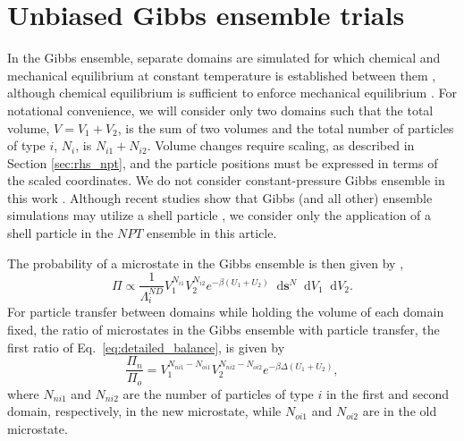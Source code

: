 \documentclass[
  9pt,
  bestpractices,
  pubversion,
]{livecoms}
\newcommand*\diff{\mathop{}\!\mathrm{d}}
\begin{document}
\begin{figure}

\end{figure}

\section{\label{sec:rhs_gibbs}Unbiased Gibbs ensemble trials}

In the Gibbs ensemble, separate domains are simulated for which chemical and mechanical equilibrium at constant temperature is established between them \cite{panagiotopoulos_direct_1987}, although chemical equilibrium is sufficient to enforce mechanical equilibrium \cite{panagiotopoulos_adsorption_1987}.
For notational convenience, we will consider only two domains such that the total volume, $V=V_1+V_2$, is the sum of two volumes and the total number of particles of type $i$, $N_i$, is $N_{i1} + N_{i2}$.
Volume changes require scaling, as described in Section \ref{sec:rhs_npt}, and the particle positions must be expressed in terms of the scaled coordinates.
We do not consider constant-pressure Gibbs ensemble in this work \cite{panagiotopoulos_phase_1988}.
Although recent studies show that Gibbs (and all other) ensemble simulations may utilize a shell particle \cite{hatch_theory_2024}, we consider only the application of a shell particle in the $NPT$ ensemble in this article.

The probability of a microstate in the Gibbs ensemble is then given by \cite{panagiotopoulos_direct_1987, frenkel_understanding_2002, hatch_theory_2024},
\begin{equation}
\Pi \propto \frac{1}{\Lambda_i^{ND}}V_1^{N_{i1}}V_2^{N_{i2}} e^{-\beta (U_1+U_2)} \diff\mathbf{s}^{N} \diff V_1 \diff V_2.
\label{eq:rhs_gibbs_pi}
\end{equation}
For particle transfer between domains while holding the volume of each domain fixed, the ratio of microstates in the Gibbs ensemble with particle transfer, the first ratio of Eq.~\ref{eq:detailed_balance}, is given by
\begin{equation}
\frac{\Pi_{n}}{\Pi_{o}} = V_1^{N_{ni1}-N_{oi1}} V_2^{N_{ni2}-N_{oi2}}e^{-\beta\Delta (U_1+U_2)},
\label{eq:rhs_gibbs_particle}
\end{equation}
where $N_{ni1}$ and $N_{ni2}$ are the number of particles of type $i$ in the first and second domain, respectively, in the new microstate, while $N_{oi1}$ and $N_{oi2}$ are in the old microstate.
\end{document}
